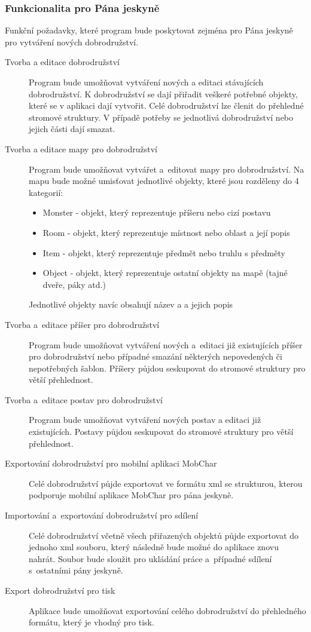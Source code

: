 \documentclass[thesis=B,czech]{resources/FITthesis}[2012/06/26]
\begin{document}
\subsubsection{Funkcionalita pro Pána jeskyně}
Funkční požadavky, které program bude poskytovat zejména pro Pána jeskyně pro vytváření nových dobrodružství.
\begin{description}


\item[Tvorba a editace dobrodružství] Program bude umožňovat vytváření nových a editaci stávajících dobrodružství. K dobrodružství se dají přiřadit veškeré potřebné objekty, které se v aplikaci dají vytvořit. Celé dobrodružství lze členit do přehledné stromové struktury. V případě potřeby se jednotlivá dobrodružství nebo jejich části dají smazat.

\item[Tvorba a editace mapy pro dobrodružství] Program bude umožňovat vytvářet a~editovat mapy pro dobrodružství. Na mapu bude možné umisťovat jednotlivé objekty, které jsou rozděleny do 4 kategorií:
\begin{itemize}
\item Monster - objekt, který reprezentuje příšeru nebo cizí postavu
\item Room - objekt, který reprezentuje místnost nebo oblast a její popis
\item Item - objekt, který reprezentuje předmět nebo truhlu s předměty
\item Object - objekt, který reprezentuje ostatní  objekty na mapě (tajné dveře, páky atd.)
\end{itemize}
Jednotlivé objekty navíc obsahují název a a jejich popis

\item[Tvorba a~editace příšer pro dobrodružství] Program bude umožňovat vytváření nových a~editaci již existujících příšer pro dobrodružství nebo případné smazání některých nepovedených či nepotřebných šablon. Příšery půjdou seskupovat do stromové struktury pro větší přehlednost.

\item[Tvorba a~editace postav pro dobrodružství] Program bude umožňovat vytváření nových postav a editaci již existujících. Postavy půjdou seskupovat do stromové struktury pro větší přehlednost.

\item[Exportování dobrodružství pro mobilní aplikaci MobChar] Celé dobrodružství půjde exportovat ve formátu xml se strukturou, kterou podporuje mobilní aplikace MobChar pro pána jeskyně.

\item[Importování a~exportování dobrodružství pro sdílení] Celé dobrodružství včetně všech přiřazených objektů půjde exportovat do jednoho xml souboru, který následně bude možné do aplikace znovu nahrát. Soubor bude sloužit pro ukládání práce a~případné sdílení s~ostatními pány jeskyně.

\item[Export dobrodružství pro tisk] Aplikace bude umožňovat exportování celého dobrodružství do přehledného formátu, který je vhodný pro tisk. 
\end{description}
\end{document}
